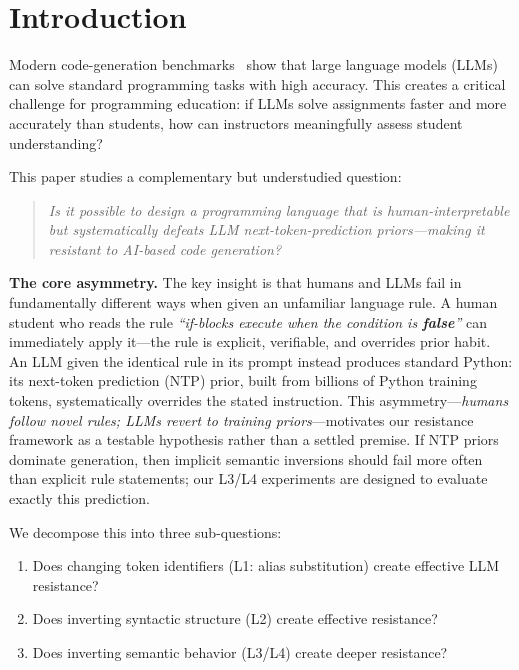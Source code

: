 \section{Introduction}
Modern code-generation benchmarks~\cite{chen2021codex,austin2021program} show that large language models (LLMs) can solve standard programming tasks with high accuracy.
This creates a critical challenge for programming education: if LLMs solve assignments faster and more accurately than students, how can instructors meaningfully assess student understanding?

This paper studies a complementary but understudied question:
\begin{quote}
\small\textit{Is it possible to design a programming language that is human-interpretable but systematically defeats LLM next-token-prediction priors---making it resistant to AI-based code generation?}
\end{quote}

\noindent\textbf{The core asymmetry.}
The key insight is that humans and LLMs fail in fundamentally different ways when given an unfamiliar language rule.
A human student who reads the rule \emph{``if-blocks execute when the condition is \textbf{false}''} can immediately apply it---the rule is explicit, verifiable, and overrides prior habit.
An LLM given the identical rule in its prompt instead produces standard Python: its next-token prediction (NTP) prior, built from billions of Python training tokens, systematically overrides the stated instruction.
This asymmetry---\emph{humans follow novel rules; LLMs revert to training priors}---motivates our resistance framework as a testable hypothesis rather than a settled premise. If NTP priors dominate generation, then implicit semantic inversions should fail more often than explicit rule statements; our L3/L4 experiments are designed to evaluate exactly this prediction.

We decompose this into three sub-questions:
\begin{enumerate}
  \item Does changing token identifiers (L1: alias substitution) create effective LLM resistance?
  \item Does inverting syntactic structure (L2) create effective resistance?
  \item Does inverting semantic behavior (L3/L4) create deeper resistance?
\end{enumerate}


